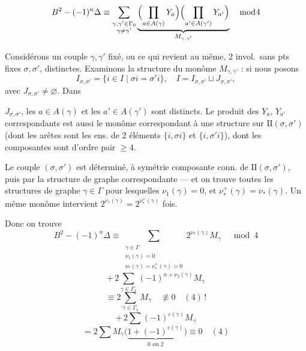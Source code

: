 \documentclass[11pt,a4paper]{article}
\begin{document}
\[
  B^2 - (-1)^n \Delta \equiv
  \sum_{\substack{\gamma, \gamma' \in \Gamma_0 \\ \gamma \neq \gamma'}}
  \underbrace{\Bigl(\prod_{a \in A(\gamma)} Y_a\Bigr)
  \Bigl(\prod_{a' \in A(\gamma')} Y_{a'}\Bigr)}_{M_{\gamma, \gamma'}}
  \quad \bmod 4
\]

Considérons un couple $\gamma, \gamma'$ fixé, ou ce qui revient au même, 2 invol.\ sans pts fixes $\sigma, \sigma'$, distinctes.  Examinons la structure du monôme $M_{\gamma, \gamma'}$ : si nous posons
\[
  I_{\sigma, \sigma'} = \{ i \in I \mid \sigma i = \sigma' i \}, \quad
  I = I_{\sigma, \sigma'} \sqcup J_{\sigma, \sigma'} ,
\]
avec $J_{\sigma, \sigma'} \neq \varnothing$. Dans

$J_{\sigma, \sigma'}$, \struck{\ill{}} les $a \in A(\gamma)$ et les $a' \in A(\gamma')$ sont distincts. \struck{\ill{}} Le produit des $Y_a$, $Y_{a'}$ correspondants est aussi le monôme correspondant à une structure   sur $\mathrm{II}(\sigma, \sigma')$ (dont les arêtes sont les ens. de 2 éléments $\{i, \sigma i\}$ et $\{i, \sigma' i\}$), dont les composantes sont d'ordre pair $\geq 4$. 

Le couple $(\sigma, \sigma')$ est déterminé, à symétrie  composante conn. de $\mathrm{II}(\sigma, \sigma')$, puis par la structure de graphe correspondante --- et on trouve  toutes les structures de graphe $\gamma \in \Gamma$ pour lesquelles  $\nu_1(\gamma) = 0$, et  $\nu_*^+(\gamma) = \nu_*(\gamma)$. Un même monôme intervient $2^{\nu_*(\gamma)} = 2^{\nu_*^+(\gamma)}$ fois.

Donc on trouve
\[
  B^2 - (-1)^n \Delta \equiv
  \sum_{\substack{\gamma \in \Gamma \\ \nu_1(\gamma) = 0 \\ \nu_*(\gamma) = \nu_*^+(\gamma) > 0}}
  2^{\nu_*(\gamma)} M_\gamma
  \quad \bmod 4
\]
\[
  + \, 2 \sum_{\gamma \in \Gamma_1} (-1)^{n + \nu_2(\gamma)} M_\gamma
\]
\[
  \equiv 2 \sum_{\gamma \in \Gamma_1} M_\gamma \quad \not\equiv 0 \quad (4)\,!
\]
\[
  + \, 2 \sum (-1)^{\varepsilon(\gamma)} M_\gamma
\]
\[
  = 2 \sum M_\gamma \bigl(\underbrace{1 + (-1)^{\varepsilon(\gamma)}}_{0 \text{ ou } 2}\bigr)
  \equiv 0 \quad (4)
\]
\end{document}
